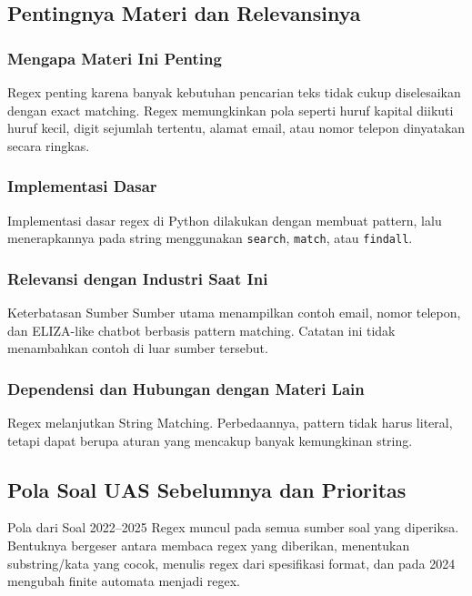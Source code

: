 \subsection{Pentingnya Materi dan Relevansinya}
\subsubsection{Mengapa Materi Ini Penting}
Regex penting karena banyak kebutuhan pencarian teks tidak cukup diselesaikan dengan exact matching. Regex memungkinkan pola seperti huruf kapital diikuti huruf kecil, digit sejumlah tertentu, alamat email, atau nomor telepon dinyatakan secara ringkas.

\subsubsection{Implementasi Dasar}
Implementasi dasar regex di Python dilakukan dengan membuat pattern, lalu menerapkannya pada string menggunakan \texttt{search}, \texttt{match}, atau \texttt{findall}.

\subsubsection{Relevansi dengan Industri Saat Ini}
\begin{cmt}{Keterbatasan Sumber}{}
Sumber utama menampilkan contoh email, nomor telepon, dan ELIZA-like chatbot berbasis pattern matching. Catatan ini tidak menambahkan contoh di luar sumber tersebut.
\end{cmt}

\subsubsection{Dependensi dan Hubungan dengan Materi Lain}
Regex melanjutkan String Matching. Perbedaannya, pattern tidak harus literal, tetapi dapat berupa aturan yang mencakup banyak kemungkinan string.

\subsection{Pola Soal UAS Sebelumnya dan Prioritas}

\begin{cmt}{Pola dari Soal 2022--2025}{}
Regex muncul pada semua sumber soal yang diperiksa. Bentuknya bergeser antara membaca regex yang diberikan, menentukan substring/kata yang cocok, menulis regex dari spesifikasi format, dan pada 2024 mengubah finite automata menjadi regex.
\end{cmt}

